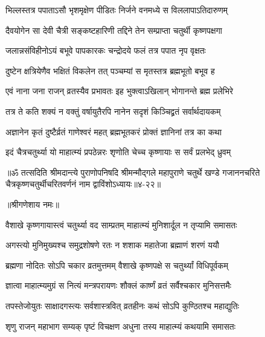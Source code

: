 \twolineshloka
{भिल्लस्तत्र पपाताऽसौ भृशमृक्षेण पीडितः}
{निर्जने वनमध्ये स विललापाऽतिदारुणम्} %

\twolineshloka
{दैवयोगेन सा देवी चैत्री सङ्कष्टहारिणी}
{तद्दिने तेन सम्प्राप्ता चतुर्थी कृष्णपक्षगा} %

\twolineshloka
{जलान्नसंविहीनोऽयं बभूवे पापकारकः}
{चन्द्रोदये फलं तत्र पपात नृप वृक्षतः} %

\twolineshloka
{दुष्टेन क्षत्रियेणैव भक्षितं विकलेन तत्}
{पञ्चम्यां स मृतस्तत्र ब्रह्मभूतो बभूव ह} %

\twolineshloka
{एवं नाना जना राजन् व्रतस्यैव प्रभावतः}
{इह भुक्त्वाऽखिलान् भोगानन्ते ब्रह्म प्रलेभिरे} %

\twolineshloka
{तत्र ते कति शक्यं न वक्तुं वर्षायुतैरपि}
{नानेन सदृशं किञ्चिद्व्रतं सर्वार्थदायकम्} %

\twolineshloka
{अज्ञानेन कृतं दुष्टैर्व्रतं गाणेश्वरं महत्}
{ब्रह्मभूतकरं प्रोक्तं ज्ञानिनां तत्र का कथा} %

\twolineshloka
{इदं चैत्रचतुर्थ्या यो माहात्म्यं प्रपठेन्नरः}
{श‍ृणोति चेच्च कृष्णायाः स सर्वं प्रलभेद् ध्रुवम्} %

॥ॐ तत्सदिति श्रीमदान्त्ये पुराणोपनिषदि श्रीमन्मौद्गले महापुराणे चतुर्थे खण्डे गजाननचरिते चैत्रकृष्णचतुर्थीचरितवर्णनं नाम द्वाविंशोऽध्यायः॥४-२२॥


\label{sec:vaishakha-krishna-chaturthi-mahatmya-varnanam}

\centerline{॥श्रीगणेशाय नमः॥}


\twolineshloka
{वैशाखे कृष्णगायास्त्वं चतुर्थ्या वद साम्प्रतम्}
{माहात्म्यं मुनिशार्दूल न तृप्यामि समासतः} %


\twolineshloka
{अगस्त्यो मुनिमुख्यश्च समुद्रशोषणे रतः}
{न शशाक महातेजा ब्रह्माणं शरणं ययौ} %

\twolineshloka
{ब्रह्मणा नोदितः सोऽपि चकार व्रतमुत्तमम्}
{वैशाखे कृष्णपक्षे स चतुर्थ्यां विधिपूर्वकम्} %

\twolineshloka
{ज्ञात्वा माहात्म्यमुग्रं स नित्यं मन्त्रपरायणः}
{शौक्लं कार्ष्णं व्रतं सर्वैश्चकार मुनिसत्तमैः} %


\twolineshloka
{तपस्तेजोयुतः साक्षादगस्त्यः सर्वशास्त्रवित्}
{व्रतहीनः कथं सोऽपि कुण्ठितश्च महाद्युतिः} %


\twolineshloka
{श‍ृणु राजन् महाभाग सम्यक् पृष्टं विचक्षण}
{अधुना तस्य माहात्म्यं कथयामि समासतः} %

